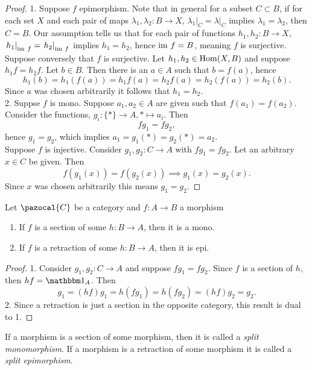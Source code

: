 \begin{proof}
    1. Suppose $f$ epimorphism. Note that in general for a subset $C\subset B$, if for each set $X$ and each pair of maps $\lambda_1,\lambda_2: B\rightarrow X$,  $\left.\lambda_1\right|_{C}=\left.\lambda\right|_C$ implies $\lambda_1 = \lambda_2$, then $C=B$. Our assumption tells us that for each pair of functions $h_1,h_2: B\rightarrow X$, $\left.h_1\right|_{\mathrm{im}\ f} = \left.  h_2\right|_{\mathrm{im}\ f}$ implies $h_1 = h_2$, hence $\mathrm{im} \ f = B$, meaning $f$ is surjective.\\
    Suppose conversely that $f$ is surjective. Let $h_1,h_2\in \mathrm{Hom}(X,B)$ and suppose $h_1 f= h_2 f$. Let $b\in B$. Then there is an $a\in A$ such that $b=f(a)$, hence
    $$h_1(b) = h_1(f(a))=h_1f(a)= h_2f(a)=h_2(f(a))=h_2(b).$$
    Since $a$ was chosen arbitrarily it follows that $h_1=h_2$.\\ 
    2. Suppse $f$ is mono. Suppose $a_1,a_2\in A$ are given such that $f(a_1)=f(a_2)$. Consider the functions, $g_i : \{\ast\} \rightarrow A,\ast\mapsto a_i$. Then 
    $$ 
        fg_1 = fg_2,
    $$
    hence $g_1 = g_2$, which implies $a_1=g_1(\ast)=g_2(\ast)= a_2$.\\
    Suppose $f$ is injective. Consider $g_1,g_2 : C\rightarrow A$ with $fg_1 = fg_2$. Let an arbitrary $x\in C$ be given. Then 
    $$
        f(g_1(x)) = f(g_2(x)) \implies g_1(x) = g_2(x).
    $$ 
    Since $x$ was chosen arbitrarily this means $g_1 = g_2$.    
\end{proof}
\begin{lemma}
    Let $\pazocal{C}$ be a category and $f : A\rightarrow B$ a morphism
    \begin{enumerate}
        \item If $f$ is a section of some $h: B\rightarrow A$, then it is a mono.
        \item If $f$ is a retraction of some $h: B\rightarrow A$, then it is epi.
    \end{enumerate} 
\end{lemma}
\begin{proof}
    1. Consider $g_1,g_2: C\rightarrow A$ and suppose $fg_1 = f g_2$. Since $f$ is a section of $h$, then $hf = \fone_A$. Then 
    $$
        g_1 = (hf)g_1 = h(fg_1) = h (fg_2)= (hf)g_2 = g_2.
    $$
    2. Since a retraction is just a section in the opposite category, this result is dual to 1.
\end{proof}
\begin{remark}
    If a morphism is a section of some morphism, then it is called a \emph{split monomorphism}. If a morphism is a retraction of some morphism it is called a \emph{split epimorphism}.
\end{remark}
